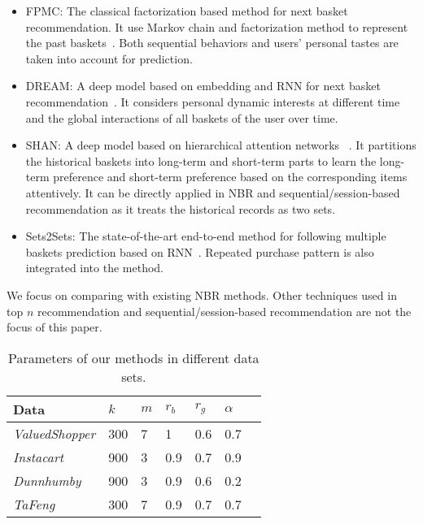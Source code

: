 \documentclass[sigconf]{acmart}
\begin{document}
\begin{itemize}

\item{FPMC:} The classical  factorization based method for next basket recommendation. It use Markov chain and factorization method to represent the past baskets~\cite{rendle2010factorizing}. Both sequential behaviors and users' personal tastes are taken into account for prediction. 
\item{DREAM:} A  deep model based on embedding and RNN for next basket  recommendation~\cite{yu2016dynamic}. It considers  personal dynamic interests at different time and the global interactions of all baskets of the user over time. 
\item{SHAN:} A deep model based on  hierarchical attention networks~\cite{ying2018sequential} . It partitions  the historical baskets into long-term and short-term parts to learn the long-term preference and short-term preference  based on the corresponding items attentively. It can be directly applied in  NBR and sequential/session-based recommendation as it treats the historical records as two sets. 
\item{Sets2Sets:} The state-of-the-art  end-to-end method for  following multiple baskets prediction based on RNN~\cite{hu2019sets2sets}. Repeated purchase pattern is also integrated into the method. 
\end{itemize}

We focus on comparing with existing
 NBR methods. Other  techniques used in   top $n$  recommendation and  sequential/session-based recommendation are not the focus of this paper.


\begin{table}[ht]
\small
\centering
\caption{Parameters of our methods in different data sets.}
\begin{tabularx}{\linewidth}{lXXXXXX}
\toprule
\textbf{Data}&$k$ &$m$  &$r_b$ &$r_g$  &$\alpha$\\
\midrule
\emph{ValuedShopper} &300 &7  &1&0.6 &0.7 \\
\emph{Instacart}&900 & 3 &0.9  &0.7  & 0.9\\
\emph{Dunnhumby} &900 &3 &0.9  &0.6 &0.2 \\
\emph{TaFeng} &300 &7 &0.9  &0.7 &0.7 \\
\bottomrule
\end{tabularx}
\label{tab:param}
\end{table}
\end{document}
